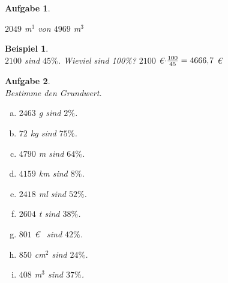 \documentclass[12pt,fleqn]{article}
\theoremstyle{aufg}
\newtheorem{aufgabe}{Aufgabe}
\theoremstyle{bsp}
\newtheorem{beispiel}{Beispiel}
\begin{document}
\begin{flushleft}
\begin{aufgabe}
\begin{multicols}{3}
\begin{enumerate}[a)]
$2049$ m$^3$ von $4969$ m$^3$
\end{enumerate} 
\end{multicols} 
\end{aufgabe} 
\begin{beispiel} ~ \\ 
$2100$ sind $45\%$. Wieviel sind 100\%? $2100$ \euro$\cdot \frac{100}{45}= 4666,\hspace{-1pt}7$ \euro\end{beispiel} 
\begin{aufgabe} ~ \\ 
Bestimme den Grundwert.\begin{multicols}{3} 
\begin{enumerate}[a)] 
\item 
$2463$ g sind $2\%$.
\item 
$72$ kg sind $75\%$.
\item 
$4790$ m sind $64\%$.
\item 
$4159$ km sind $8\%$.
\item 
$2418$ ml sind $52\%$.
\item 
$2604$ t sind $38\%$.
\item 
$801$ \euro~ sind $42\%$.
\item 
$850$ cm$^2$ sind $24\%$.
\item 
$408$ m$^3$ sind $37\%$.
\end{enumerate} 
\end{multicols} 
\end{aufgabe} 

\end{flushleft}
\end{document}
